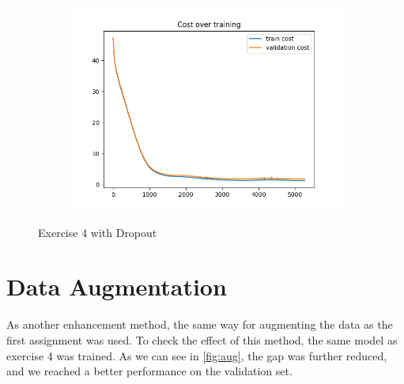 \documentclass[a4paper]{article}
\begin{document}
\begin{figure}[h]
\begin{subfigure}{0.3\textwidth}
		\includegraphics[width=\linewidth]{images/model_of_ex4_dropout__cost.png}
		\caption{}
	\end{subfigure}
	\caption{Exercise 4 with Dropout}
	\label{fig:dropout}
\end{figure}

\section{Data Augmentation}

As another enhancement method, the same way for augmenting the data as the first assignment was used. To check the effect of this method, the same model as exercise 4 was trained. As we can see in \autoref{fig:aug}, the gap was further reduced, and we reached a better performance on the validation set.
\end{document}
